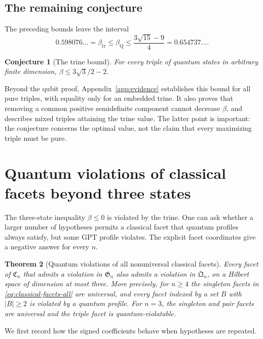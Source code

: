 \documentclass[10pt,a4paper]{amsart}
\newtheorem{theorem}{Theorem}[section]
\newtheorem{conjecture}[theorem]{Conjecture}
\newcommand{\1}{\mathbf 1}
\newcommand{\Creg}{\mathfrak C}
\newcommand{\Qreg}{\mathfrak Q}
\newcommand{\Greg}{\mathfrak G}
\newcommand{\btr}{\beta_{\mathrm{tr}}}
\begin{document}
\subsection{The remaining conjecture}

The preceding bounds leave the interval
\begin{equation}\label{eq:remaining-interval}
 0.598076\ldots=\btr
 \le\beta_{\mathrm Q}
 \le\frac{3\sqrt{15}-9}{4}=0.654737\ldots.
\end{equation}

\begin{conjecture}[The trine bound]\label{conj:trine}
For every triple of quantum states in arbitrary finite dimension,
$\beta\le3\sqrt3/2-2$.
\end{conjecture}

Beyond the qubit proof, Appendix~\ref{app:evidence} establishes this bound for
all pure triples, with equality only for an embedded trine. It also proves
that removing a common positive semidefinite component cannot decrease
$\beta$, and describes mixed triples attaining the trine value. The latter
point is important: the conjecture concerns the optimal value, not the claim
that every maximizing triple must be pure.


\section{Quantum violations of classical facets beyond three states}
\label{sec:all-facets}

The three-state inequality $\beta\le0$ is violated by the trine. One can ask
whether a larger number of hypotheses permits a classical facet that quantum
profiles always satisfy, but some GPT profile violates. The explicit facet
coordinates give a negative answer for every $n$.

\begin{theorem}[Quantum violations of all nonuniversal classical facets]
\label{thm:all-facets}
Every facet of $\Creg_n$ that admits a violation in $\Greg_n$ also admits a
violation in $\Qreg_n$, on a Hilbert space of dimension at most three.
More precisely, for $n\ge4$ the singleton facets in
\eqref{eq:classical-facets-all} are universal, and every facet indexed by a set
$B$ with $|B|\ge2$ is violated by a quantum profile. For $n=3$, the singleton
and pair facets are universal and the triple facet is quantum-violatable.
\end{theorem}

We first record how the signed coefficients behave when hypotheses are
repeated.
\end{document}
